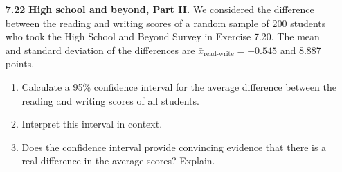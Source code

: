 \documentclass[a4paper, 12pt]{../../config/homework}
\begin{document}
\begin{enumerate}
\pagebreak
\item[\textbf{7.22}] \textbf{High school and beyond, Part II.} We considered the difference between the reading and writing scores of a random sample of 200 students who took the High School and Beyond Survey in Exercise 7.20. The mean and standard deviation of the differences are \(\bar{x}_{\text{read-write}}=-0.545\) and 8.887 points.
\begin{enumerate}[label=(\alph*)]
\item Calculate a 95\% confidence interval for the average difference between the reading and writing scores of all students.
\item Interpret this interval in context.
\item Does the confidence interval provide convincing evidence that there is a real difference in the average scores? Explain.
\end{enumerate}
\end{enumerate}
\end{document}
